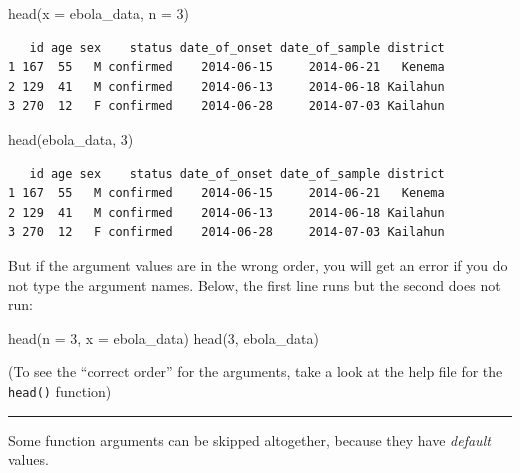 \documentclass[
  letterpaper,
  DIV=11,
  numbers=noendperiod]{scrreprt}
\newenvironment{Shaded}{\begin{snugshade}}{\end{snugshade}}
\newcommand{\AttributeTok}[1]{\textcolor[rgb]{0.40,0.45,0.13}{#1}}
\newcommand{\DecValTok}[1]{\textcolor[rgb]{0.68,0.00,0.00}{#1}}
\newcommand{\FunctionTok}[1]{\textcolor[rgb]{0.28,0.35,0.67}{#1}}
\newcommand{\NormalTok}[1]{\textcolor[rgb]{0.00,0.23,0.31}{#1}}
\begin{document}
\begin{Shaded}
\begin{Highlighting}[]
\FunctionTok{head}\NormalTok{(}\AttributeTok{x =}\NormalTok{ ebola\_data, }\AttributeTok{n =} \DecValTok{3}\NormalTok{)}
\end{Highlighting}
\end{Shaded}

\begin{verbatim}
   id age sex    status date_of_onset date_of_sample district
1 167  55   M confirmed    2014-06-15     2014-06-21   Kenema
2 129  41   M confirmed    2014-06-13     2014-06-18 Kailahun
3 270  12   F confirmed    2014-06-28     2014-07-03 Kailahun
\end{verbatim}

\begin{Shaded}
\begin{Highlighting}[]
\FunctionTok{head}\NormalTok{(ebola\_data, }\DecValTok{3}\NormalTok{)}
\end{Highlighting}
\end{Shaded}

\begin{verbatim}
   id age sex    status date_of_onset date_of_sample district
1 167  55   M confirmed    2014-06-15     2014-06-21   Kenema
2 129  41   M confirmed    2014-06-13     2014-06-18 Kailahun
3 270  12   F confirmed    2014-06-28     2014-07-03 Kailahun
\end{verbatim}

But if the argument values are in the wrong order, you will get an error
if you do not type the argument names. Below, the first line runs but
the second does not run:

\begin{Shaded}
\begin{Highlighting}[]
\FunctionTok{head}\NormalTok{(}\AttributeTok{n =} \DecValTok{3}\NormalTok{, }\AttributeTok{x =}\NormalTok{ ebola\_data)}
\FunctionTok{head}\NormalTok{(}\DecValTok{3}\NormalTok{, ebola\_data)}
\end{Highlighting}
\end{Shaded}

(To see the ``correct order'' for the arguments, take a look at the help
file for the \texttt{head()} function)

\begin{center}\rule{0.5\linewidth}{0.5pt}\end{center}

Some function arguments can be skipped altogether, because they have
\emph{default} values.
\end{document}
